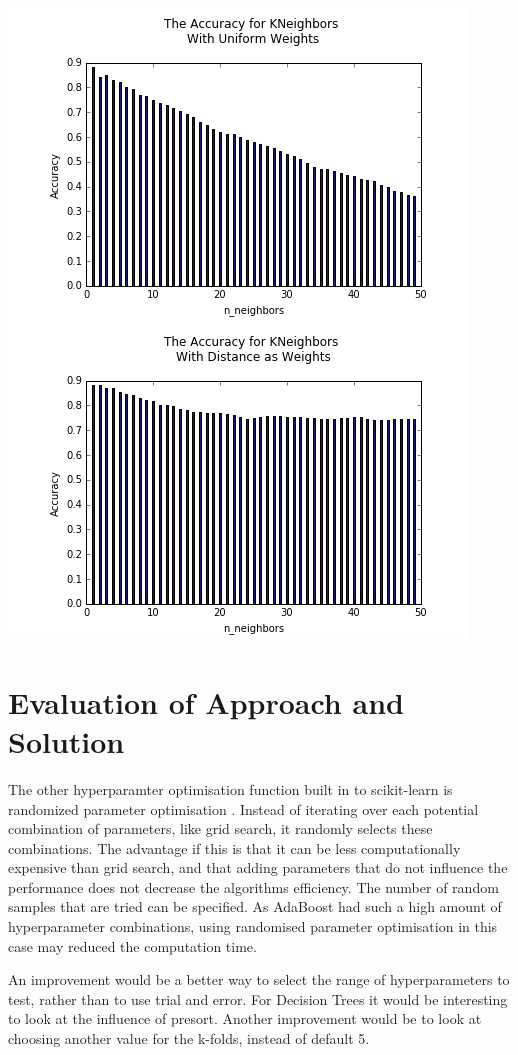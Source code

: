 \documentclass{article}
\begin{document}
\includegraphics[scale=0.6]{k-nboors}

\section{Evaluation of Approach and Solution} 



	The other hyperparamter optimisation function built in to  scikit-learn is randomized parameter optimisation \cite{gridsearch}. Instead of iterating over each potential combination of parameters, like grid search, it randomly selects these combinations. The advantage if this is that it can be less computationally expensive than grid search, and that adding parameters that do not influence the performance does not decrease the algorithms efficiency. The number of random samples that are tried can be specified.  As AdaBoost had such a high amount of hyperparameter combinations, using randomised parameter optimisation in this case may reduced the computation time. 

	An improvement would be a better way to select the range of hyperparameters to test, rather than to use trial and error.
	For Decision Trees it would be interesting to look at the influence of presort.
	Another improvement would be to look at choosing another value for the k-folds, instead of default 5. 



\end{document}
